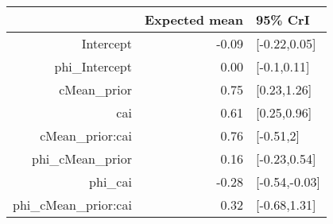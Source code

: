 \begin{tabular}{rrl}
  \hline
 & Expected mean & 95\% CrI \\ 
  \hline
Intercept & -0.09 & [-0.22,0.05] \\ 
  phi\_Intercept & 0.00 & [-0.1,0.11] \\ 
  cMean\_prior & 0.75 & [0.23,1.26] \\ 
  cai & 0.61 & [0.25,0.96] \\ 
  cMean\_prior:cai & 0.76 & [-0.51,2] \\ 
  phi\_cMean\_prior & 0.16 & [-0.23,0.54] \\ 
  phi\_cai & -0.28 & [-0.54,-0.03] \\ 
  phi\_cMean\_prior:cai & 0.32 & [-0.68,1.31] \\ 
   \hline
\end{tabular}

